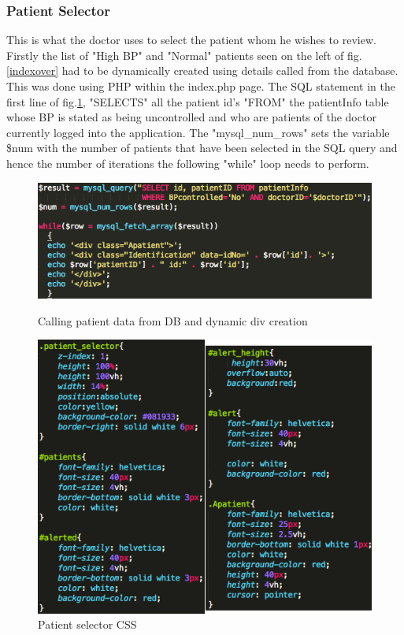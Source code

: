 \documentclass[11pt]{article}
\begin{document}
\subsubsection{Patient Selector} 
This is what the doctor uses to select the patient whom he wishes to review. Firstly the list of "High BP" and "Normal" patients seen on the left of fig.\ref{indexover} had to be dynamically created using details called from the database. This was done using PHP within the index.php page. The SQL statement in the first line of fig.\ref{selectorphp}, "SELECTS" all the patient id's "FROM" the patientInfo table whose BP is stated as being uncontrolled and who are patients of the doctor currently logged into the application. The "mysql\_num\_rows" sets the variable \$num with the number of patients that have been selected in the SQL query and hence the number of iterations the following "while" loop needs to perform. 
\begin{figure}[h!] 
\includegraphics[width=\linewidth]{selectorphp.png}
\caption{Calling patient data from DB and dynamic div creation \label{selectorphp}}
\endminipage\hfill
{}
\includegraphics[width=\linewidth]{selectorCSS.png}
\caption{Patient selector CSS}
\endminipage
\end{figure} 
\end{document}
